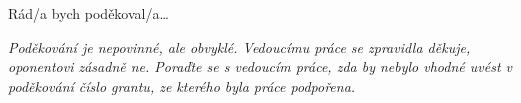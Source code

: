 Rád/a bych poděkoval/a… 
    
\textit{Poděkování je nepovinné, ale obvyklé. 
Vedoucímu práce se zpravidla děkuje, oponentovi zásadně ne. 
Poraďte se s vedoucím práce, zda by nebylo vhodné uvést v poděkování číslo grantu, ze kterého byla práce podpořena.}